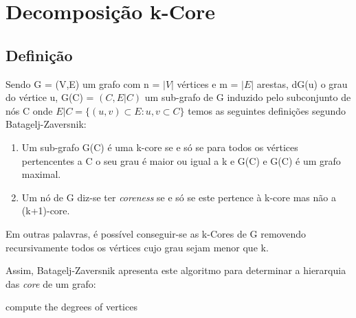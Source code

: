 \documentclass[a4paper,10pt]{report}
\begin{document}
\section*{Decomposição k-Core}


\subsection*{Definição}
Sendo G = (V,E) um grafo com n = $|V|$ vértices e m = $|E|$ arestas, dG(u) o grau do vértice u, G(C) = $(C, E|C)$ um sub-grafo de G induzido pelo subconjunto de nós C onde $E|C = \{(u,v)\subset E : u,v \subset C\} $ temos as seguintes definições segundo Batagelj-Zaversnik:

\begin{enumerate}
	\item Um sub-grafo G(C) é uma k-core se e só se para todos os vértices pertencentes a C o seu grau é maior ou igual a k e G(C) e G(C) é um grafo maximal.
	\item Um nó de G diz-se ter \textit{coreness} se e só se este pertence à k-core mas não a (k+1)-core.
\end{enumerate}


Em outras palavras, é possível conseguir-se as k-Cores de G removendo recursivamente todos os vértices cujo grau sejam menor que k.

Assim, Batagelj-Zaversnik apresenta este algoritmo para determinar a hierarquia das \textit{core} de um grafo:


\begin{algorithm}[H]
 compute the degrees of vertices\;
\end{algorithm}
\end{document}
